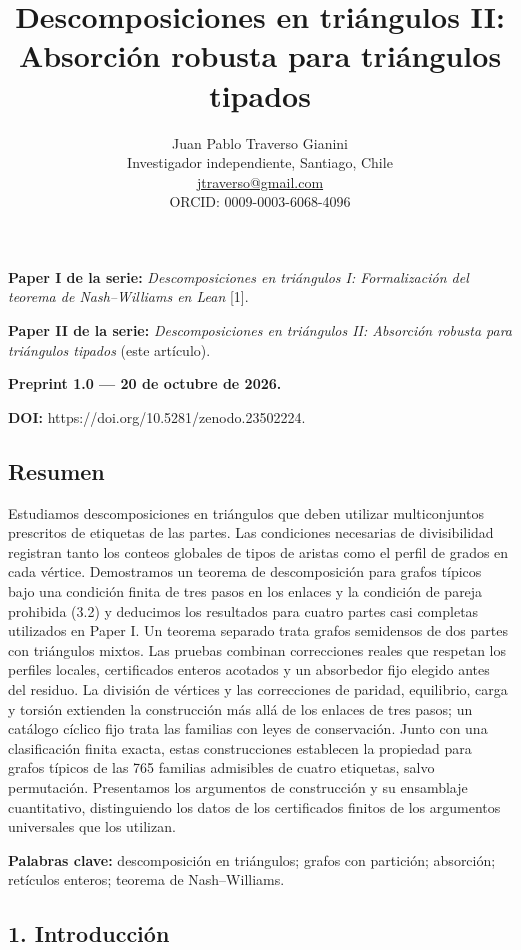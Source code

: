 \documentclass[spanish,11pt,a4paper]{article}
\title{Descomposiciones en triángulos II: Absorción robusta para triángulos tipados}
\author{Juan Pablo Traverso Gianini\\
\small Investigador independiente, Santiago, Chile\\
\small \href{mailto:jtraverso@gmail.com}{jtraverso@gmail.com}\\
\small ORCID: 0009-0003-6068-4096}
\date{}
\begin{document}
\raggedbottom
\maketitle
\textbf{Paper I de la serie:} \emph{Descomposiciones en triángulos I: Formalización del teorema de Nash--Williams en Lean} {[}1{]}.

\textbf{Paper II de la serie:} \emph{Descomposiciones en triángulos II: Absorción robusta para triángulos tipados} (este artículo).

\textbf{Preprint 1.0 --- 20 de octubre de 2026.}

\textbf{DOI:} https://doi.org/10.5281/zenodo.23502224.

\subsection{Resumen}\label{resumen}

Estudiamos descomposiciones en triángulos que deben utilizar multiconjuntos prescritos de etiquetas de las partes. Las condiciones necesarias de divisibilidad registran tanto los conteos globales de tipos de aristas como el perfil de grados en cada vértice. Demostramos un teorema de descomposición para grafos típicos bajo una condición finita de tres pasos en los enlaces y la condición de pareja prohibida (3.2) y deducimos los resultados para cuatro partes casi completas utilizados en Paper I. Un teorema separado trata grafos semidensos de dos partes con triángulos mixtos. Las pruebas combinan correcciones reales que respetan los perfiles locales, certificados enteros acotados y un absorbedor fijo elegido antes del residuo. La división de vértices y las correcciones de paridad, equilibrio, carga y torsión extienden la construcción más allá de los enlaces de tres pasos; un catálogo cíclico fijo trata las familias con leyes de conservación. Junto con una clasificación finita exacta, estas construcciones establecen la propiedad para grafos típicos de las 765 familias admisibles de cuatro etiquetas, salvo permutación. Presentamos los argumentos de construcción y su ensamblaje cuantitativo, distinguiendo los datos de los certificados finitos de los argumentos universales que los utilizan.

\textbf{Palabras clave:} descomposición en triángulos; grafos con partición; absorción; retículos enteros; teorema de Nash--Williams.

\subsection{1. Introducción}\label{introducciuxf3n}
\end{document}
